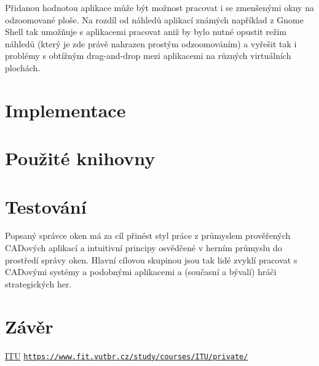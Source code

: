 \documentclass[12pt,a4paper,titlepage,final]{article}
\begin{document}
Přidanou hodnotou aplikace může být možnost pracovat i se zmenšenými okny na odzoomované ploše.
Na rozdíl od náhledů aplikací známých například z Gnome Shell tak umožňuje s aplikacemi pracovat aniž by bylo nutné opustit režim náhledů (který je zde právě nahrazen prostým odzoomováním) a vyřešit tak i problémy s obtížným drag-and-drop mezi aplikacemi na různých virtuálních plochách.

\section{Implementace}

\section{Použité knihovny}

\section{Testování}

Popsaný správce oken má za cíl přinést styl práce z průmyslem prověřených CADových aplikací a intuitivní principy osvědčené v herním průmyslu do prostředí správy oken.
Hlavní cílovou skupinou jsou tak lidé zvyklí pracovat s CADovými systémy a podobnými aplikacemi a (současní a bývalí) hráči strategických her.

\section{Závěr} \label{zaver}

\begin{thebibliography}{1}

\href{https://www.fit.vutbr.cz/study/courses/ITU/private/}{ITU} \newline
\href{https://www.fit.vutbr.cz/study/courses/ITU/private/}{\nolinkurl{https://www.fit.vutbr.cz/study/courses/ITU/private/}}

\end{thebibliography}

\end{document}
